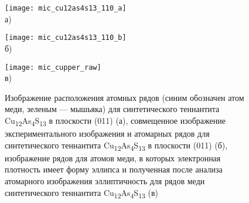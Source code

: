 \begin{figure}[ht]
  \begin{minipage}[ht]{0.3\linewidth}\centering
    \texttt{[image: mic\_cu12as4s13\_110\_a]} \\ а)
  \end{minipage}
  \hfill
  \begin{minipage}[ht]{0.3\linewidth}\centering
    \texttt{[image: mic\_cu12as4s13\_110\_b]} \\ б)
  \end{minipage}
  \hfill
  \begin{minipage}[ht]{0.3\linewidth}\centering
    \texttt{[image: mic\_cupper\_raw]} \\ в)
  \end{minipage}
      \caption[Изображение расположения атомных рядов (синим обозначен атом меди, зеленым --- мышьяка) для синтетического теннантита Cu\textsubscript{12}As\textsubscript{4}S\textsubscript{13} в плоскости (011) (а), совмещенное изображение экспериментального изображения и атомарных рядов для синтетического теннантита Cu\textsubscript{12}As\textsubscript{4}S\textsubscript{13} в плоскости (011) (б),  изображение  рядов для атомов меди, в которых электронная плотность имеет форму эллипса и полученная после анализа атомарного изображения эллиптичность для рядов меди синтетического теннантита Cu\textsubscript{12}As\textsubscript{4}S\textsubscript{13} (в)]{Изображение расположения атомных рядов (синим обозначен атом меди, зеленым --- мышьяка) для синтетического теннантита Cu\textsubscript{12}As\textsubscript{4}S\textsubscript{13} в плоскости (011) (а), совмещенное изображение экспериментального изображения и атомарных рядов для синтетического теннантита Cu\textsubscript{12}As\textsubscript{4}S\textsubscript{13} в плоскости (011) (б),  изображение  рядов для атомов меди, в которых электронная плотность имеет форму эллипса и полученная после анализа атомарного изображения эллиптичность для рядов меди синтетического теннантита Cu\textsubscript{12}As\textsubscript{4}S\textsubscript{13} (в)}
    \label{img:figure5}
\end{figure}

